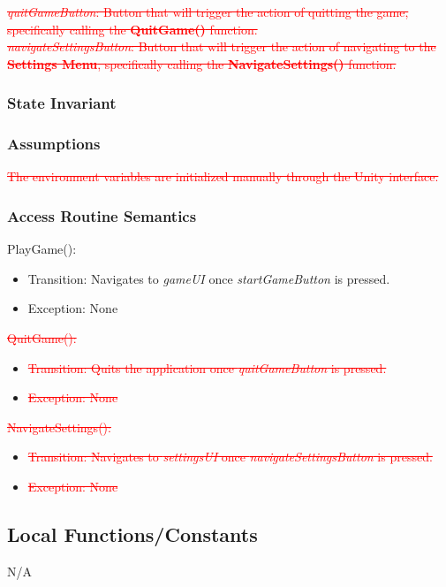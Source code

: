 \documentclass[12pt]{article}
\begin{document}
\noindent \textcolor{red}{\sout{\textit{quitGameButton}: Button that will trigger the action of quitting the game, specifically calling the \textbf{QuitGame()} function.}}\\

\noindent \textcolor{red}{\sout{\textit{navigateSettingsButton}: Button that will trigger the action of navigating to the \textbf{Settings Menu}, specifically calling the \textbf{NavigateSettings()} function.}}\\

\subsubsection {State Invariant}

\subsubsection {Assumptions}
\textcolor{red}{\sout{The environment variables are initialized manually through the Unity interface.}}

\subsubsection {Access Routine Semantics}
PlayGame():
\begin{itemize}
    \item Transition: Navigates to \textit{gameUI} once \textit{startGameButton} is pressed.
    \item Exception: None
\end{itemize}


\textcolor{red}{\sout{\noindent QuitGame():}}
\begin{itemize}
    \item \textcolor{red}{\sout{Transition: Quits the application once \textit{quitGameButton} is pressed.}}
    \item \textcolor{red}{\sout{Exception: None}}
\end{itemize}

\noindent \textcolor{red}{\sout{NavigateSettings():}}
\begin{itemize}
    \item \textcolor{red}{\sout{Transition: Navigates to \textit{settingsUI} once \textit{navigateSettingsButton} is pressed.}}
    \item \textcolor{red}{\sout{Exception: None}}
\end{itemize}

\subsection{Local Functions/Constants}
N/A
\medskip
\end{document}
